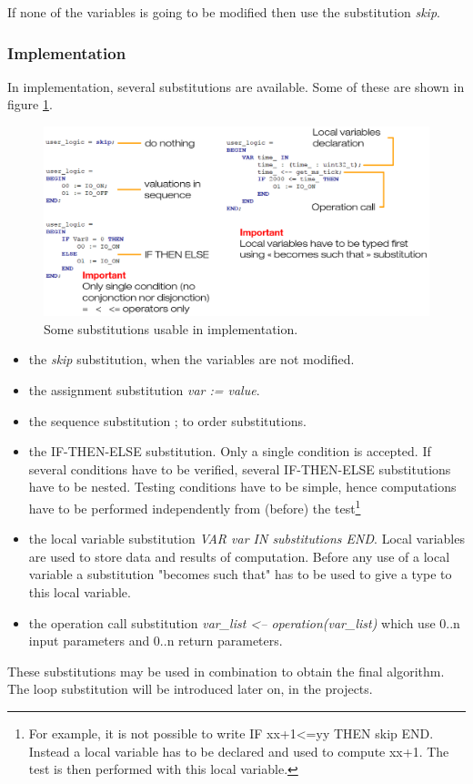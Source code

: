If none of the variables is going to be modified then use the substitution \textit{skip}.\\

\subsubsection{Implementation}

In implementation, several substitutions are available. Some of these are shown in figure \ref{programming:subst-implem}.

\begin{figure}[ht]
\centering\includegraphics[scale=0.30]{Pictures/chapterProgramming/subst-implem.png}
\caption{Some substitutions usable in implementation. }
\label{programming:subst-implem}
\end{figure}  

\begin{itemize}
    \item the \textit{skip} substitution, when the variables are not modified.
    \item the assignment substitution \textit{var := value}.
    \item the sequence substitution ; to order substitutions.
    \item the IF-THEN-ELSE substitution. Only a single condition is accepted. If several conditions have to be verified, several IF-THEN-ELSE substitutions have to be nested. Testing conditions have to be simple, hence computations have to be performed independently from (before) the test\footnote{For example, it is not possible to write IF xx+1<=yy THEN skip END. Instead a local variable has to be declared and used to compute xx+1. The test is then performed with this local variable.}
    \item the local variable substitution \textit{VAR var IN substitutions END}. Local variables are used to store data and results of computation. Before any use of a local variable a substitution "becomes such that" has to be used to give a type to this local variable.
    \item the operation call substitution \textit{var\_list <-- operation(var\_list)} which use 0..n input parameters and 0..n return parameters.
\end{itemize}
These substitutions may be used in combination to obtain the final algorithm. The loop substitution will be introduced later on, in the projects.

